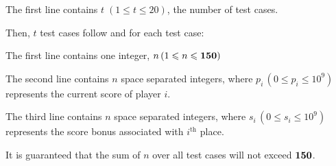 The first line contains $t \; (1 \leqslant t \leqslant 20)$, the number of test cases.

Then, $t$ test cases follow and for each test case:

The first line contains one integer, $n \, (1 \leqslant n \leqslant \bf{150})$

The second line contains $n$ space separated integers, where $p_i \, (0 \leqslant p_i \leqslant 10^9)$ represents the current score of player $i$.

The third line contains $n$ space separated integers, where $s_i \, (0 \leqslant s_i \leqslant 10^9)$ represents the score bonus associated with $i^{\text{th}}$ place.

It is guaranteed that the sum of $n$ over all test cases will not exceed $\bf{150}$.
